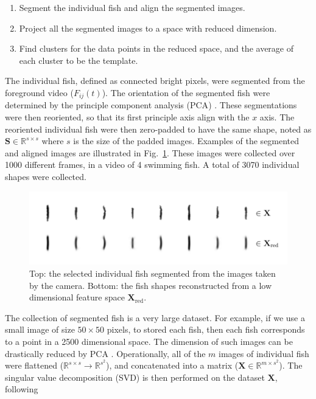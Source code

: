 \documentclass[11pt,twoside]{report}
\begin{document}
\begin{enumerate}
	\item Segment the individual fish and align the segmented images.
	\item Project all the segmented images to a space with reduced dimension.
	\item Find clusters for the data points in the reduced space, and the average of each cluster to be the template.
\end{enumerate}

The individual fish, defined as connected bright pixels, were segmented from the foreground video ($F_{ij}(t)$).
The orientation of the segmented fish were determined by the principle component analysis (\gls{PCA}) \cite{goodfellow2016}. 
These segmentations were then reoriented, so that its first principle axis align with the $x$ axis. The reoriented individual fish were then zero-padded to have the same shape, noted as $\mathbf{S} \in \mathbb{R}^{s \times s}$ where $s$ is the size of the padded images.
Examples of the segmented and aligned images are illustrated in Fig.~\ref{fig:fish_segment}. These images were collected over 1000 different frames, in a video of 4 swimming fish. A total of 3070 individual shapes were collected.

\begin{figure}
  \includegraphics[width=\linewidth]{shapes}
  \caption[Examples of segmented individual fish]{
  Top: the selected individual fish segmented from the images taken by the camera.
  Bottom: the fish shapes reconstructed from a low dimensional feature space $\mathbf{X}_\mathrm{red}$.
  }
  \label{fig:fish_segment}
\end{figure}

The collection of segmented fish is a very large dataset.
For example, if we use a small image of size $50 \times 50$ pixels, to stored each fish, then each fish corresponds to a point in a 2500 dimensional space.
The dimension of such images can be drastically reduced by PCA \cite{solem2012book, geron2019}. Operationally, all of the $m$ images of individual fish were flattened
($\mathbb{R}^{s \times s} \rightarrow \mathbb{R}^{s^2}$),
and concatenated into a matrix ($\mathbf{X} \in \mathbb{R}^{m \times s^2}$).%
The singular value decomposition (\gls{SVD}) is then performed on the dataset $\mathbf{X}$, following
\end{document}
